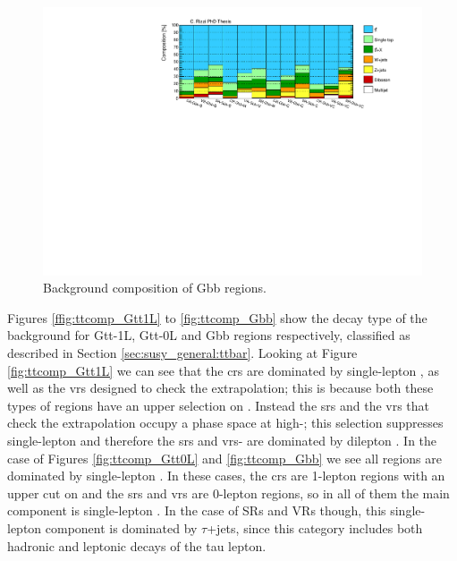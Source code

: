 \begin{figure}[htbp]
\includegraphics[width=\textwidth]{figures/strong_prod/comp_plots/Gbb_bkg.pdf}
\caption{Background composition of Gbb regions.}
	\label{fig:bkgcomp_Gbb}
\end{figure}


Figures \ref{ffig:ttcomp_Gtt1L} to \ref{fig:ttcomp_Gbb} show the decay type of the \ttbar background for  Gtt-1L, Gtt-0L and Gbb regions respectively, classified as described in Section \ref{sec:susy_general:ttbar}.
Looking at Figure \ref{fig:ttcomp_Gtt1L} we can see that the \glspl{cr} are dominated by single-lepton \ttbar, as well as the \glspl{vr} designed to check the \mtb extrapolation;
this is because both these types of regions have an upper selection on \mt.
Instead the \glspl{sr} and the \glspl{vr} that check the \mt extrapolation occupy a phase space at high-\mt;
this selection suppresses single-lepton \ttbar and therefore the \glspl{sr} and \glspl{vr}-\mt
are dominated by dilepton \ttbar.
In the case of Figures \ref{fig:ttcomp_Gtt0L} and \ref{fig:ttcomp_Gbb} we see all regions are dominated by single-lepton \ttbar.
In these cases, the \glspl{cr} are 1-lepton regions with an upper cut on \mt and the \glspl{sr} and \glspl{vr} are 0-lepton regions,
so in all of them the main component is  single-lepton \ttbar. In the case of SRs and VRs though, this single-lepton component
is dominated by $\tau$+jets, since this category includes both hadronic and leptonic decays of the tau lepton.



